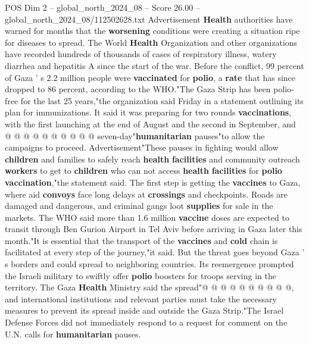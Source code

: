 \begin{textsample}{POS Dim 2 – global\_north\_2024\_08 – Score 26.00 – global\_north\_2024\_08/112502628.txt}
Advertisement \textbf{Health} authorities have warned for months that the \textbf{worsening} conditions were creating a situation ripe for diseases to spread.
The World \textbf{Health} Organization and other organizations have recorded hundreds of thousands of cases of respiratory illness, watery diarrhea and hepatitis A since the start of the war.
Before the conflict, 99 percent of Gaza ' s 2.2 million people were \textbf{vaccinated} for \textbf{polio}, a \textbf{rate} that has since dropped to 86 percent, according to the WHO."The Gaza Strip has been polio-free for the last 25 years,"the organization said Friday in a statement outlining its plan for immunizations.
It said it was preparing for two rounds \textbf{vaccinations}, with the first launching at the end of August and the second in September, and @ @ @ @ @ @ @ @ @ @ seven-day"\textbf{humanitarian} pauses"to allow the campaigns to proceed.
Advertisement"These pauses in fighting would allow \textbf{children} and families to safely reach \textbf{health} \textbf{facilities} and community outreach \textbf{workers} to get to \textbf{children} who can not access \textbf{health} \textbf{facilities} for \textbf{polio} \textbf{vaccination},"the statement said.
The first step is getting the \textbf{vaccines} to Gaza, where aid \textbf{convoys} face long delays at \textbf{crossings} and checkpoints.
Roads are damaged and dangerous, and criminal gangs loot \textbf{supplies} for sale in the markets.
The WHO said more than 1.6 million \textbf{vaccine} doses are expected to transit through Ben Gurion Airport in Tel Aviv before arriving in Gaza later this month."It is essential that the transport of the \textbf{vaccines} and \textbf{cold} chain is facilitated at every step of the journey,"it said.
But the threat goes beyond Gaza ' s borders and could spread to neighboring countries.
Its reemergence prompted the Israeli military to swiftly offer \textbf{polio} boosters for troops serving in the territory.
The Gaza \textbf{Health} Ministry said the spread"@ @ @ @ @ @ @ @ @ @, and international institutions and relevant parties must take the necessary measures to prevent its spread inside and outside the Gaza Strip."The Israel Defense Forces did not immediately respond to a request for comment on the U.N. calls for \textbf{humanitarian} pauses.

\end{textsample}
